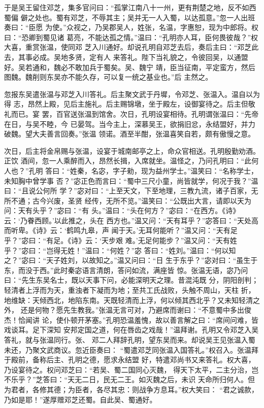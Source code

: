 于是吴王留住邓芝，集多官问曰：“孤掌江南八十一州，更有荆楚之地，反不如西蜀偏
僻之处也。蜀有邓芝，不辱其主；吴并无一人入蜀，以达孤意。”忽一人出班奏曰：“臣愿
为使。”众视之，乃吴郡吴人，姓张，名温，字惠恕，现为中郎将。权曰：“恐卿到蜀见诸
葛亮，不能达孤之情。”温曰：“孔明亦人耳，臣何畏彼哉？”权大喜，重赏张温，使同邓
芝入川通好。却说孔明自邓芝去后，奏后主曰：“邓芝此去，其事必成。吴地多贤，定有人
来答礼。陛下当礼貌之，令彼回吴，以通盟好。吴若通和，魏必不敢加兵于蜀矣。吴、魏宁
靖，臣当征南，平定蛮方，然后图魏。魏削则东吴亦不能久存，可以复一统之基业也。”后
主然之。

忽报东吴遣张温与邓芝入川答礼。后主聚文武于丹墀，令邓芝、张温入。温自以为得
志，昂然上殿，见后主施礼。后主赐锦墩，坐于殿左，设御宴待之。后主但敬礼而已。宴
罢，百官送张温到馆舍。次日，孔明设宴相待。孔明谓张温曰：“先帝在日，与吴不睦，今
已晏驾。当今主上，深慕吴王，欲捐旧忿，永结盟好，并力破魏。望大夫善言回奏。”张温
领诺。酒至半酣，张温喜笑自若，颇有傲慢之意。

次日，后主将金帛赐与张温，设宴于城南邮亭之上，命众官相送。孔明殷勤劝酒。正饮
酒间，忽一人乘醉而入，昂然长揖，入席就坐。温怪之，乃问孔明曰：“此何人也？”孔明
答曰：“姓秦，名宓，字子勑，现为益州学士。”温笑曰：“名称学士，未知胸中曾学事
否？”宓正色而言曰：“蜀中三尺小童，尚皆就学，何况于我？”温曰：“且说公何所
学？”宓对曰：“上至天文，下至地理，三教九流，诸子百家，无所不通；古今兴废，圣贤
经传，无所不览。”温笑曰：“公既出大言，请即以天为问：天有头乎？”宓曰：“有
头。”温曰：“头在何方？”宓曰：“在西方。《诗》云：‘乃眷西顾。’以此推之，头在
西方也。”温又问：“天有耳乎？”宓答曰：“天处高而听卑。《诗》云：‘鹤鸣九皋，声
闻于天。’无耳何能听？”温又问：“天有足乎？”宓曰：“有足。《诗》云：‘天步艰
难。’无足何能步？”温又问：“天有姓乎？”宓曰：“岂得无姓！”温曰：“何姓？”宓
答曰：“姓刘。”温曰：“何以知之？”宓曰：“天子姓刘，以故知之。”温又问曰：“日
生于东乎？”宓对曰：“虽生于东，而没于西。”此时秦宓语言清朗，答问如流，满座皆
惊。张温无语，宓乃问曰：“先生东吴名士，既以天事下问，必能深明天之理。昔混沌既
分，阴阳剖判；轻清者上浮而为天，重浊者下凝而为地；至共工氏战败，头触不周山，天柱
折，地维缺：天倾西北，地陷东南。天既轻清而上浮，何以倾其西北乎？又未知轻清之外，
还是何物？愿先生教我。”张温无言可对，乃避席而谢曰：“不意蜀中多出俊杰！恰闻讲
论，使仆顿开茅塞。”孔明恐温羞愧，故以善言解之曰：“席间问难，皆戏谈耳。足下深知
安邦定国之道，何在唇齿之戏哉！”温拜谢。孔明又令邓芝入吴答礼，就与张温同行。张、
邓二人拜辞孔明，望东吴而来。却说吴王见张温入蜀未还，乃聚文武商议。忽近臣奏曰：
“蜀遣邓芝同张温入国答礼。”权召入。张温拜于殿前，备称后主、孔明之德，愿求永结盟
好，特遣邓尚书又来答礼。权大喜，乃设宴待之。权问邓芝曰：“若吴、蜀二国同心灭魏，
得天下太平，二主分治，岂不乐乎？”芝答曰：“天无二日，民无二王。如灭魏之后，未识
天命所归何人。但为君者，各修其德；为臣者，各尽其忠：则战争方息耳。”权大笑曰：
“君之诚款，乃如是耶！”遂厚赠邓芝还蜀。自此吴、蜀通好。

